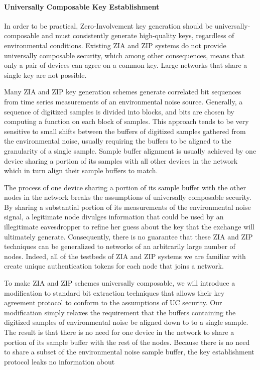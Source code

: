 \documentclass[10pt,onecolumn]{article}
\begin{document}
\paragraph{Universally Composable Key Establishment}

In order to be practical, Zero-Involvement key generation should be universally-composable and must consistently generate high-quality keys, regardless of environmental conditions.
Existing ZIA and ZIP systems do not provide universally composable security, which among other consequences, means that only a pair of devices can agree on a common key.
Large networks that share a single key are not possible.


Many ZIA and ZIP key generation schemes generate correlated bit sequences from time series measurements of an environmental noise source.
Generally, a sequence of digitized samples is divided into blocks, and bits are chosen by computing a function on each block of samples\cite{voltkey,Lin-H2B,Lee-WiSec20}.
This approach tends to be very sensitive to small shifts between the buffers of digitized samples gathered from the environmental noise, usually requiring the buffers to be aligned to the granularity of a single sample.
Sample buffer alignment is usually achieved by one device sharing a portion of its samples with all other devices in the network which in turn align their sample buffers to match.


The process of one device sharing a portion of its sample buffer with the other nodes in the network breaks the assumptions of universally composable security.
By sharing a substantial portion of its measurements of the environmental noise signal, a legitimate node divulges information that could be used by an illegitimate eavesdropper to refine her guess about the key that the exchange will ultimately generate.
Consequently, there is no guarantee that these ZIA and ZIP techniques can be generalized to networks of an arbitrarily large number of nodes.
Indeed, all of the testbeds of ZIA and ZIP systems we are familiar with create unique authentication tokens for each node that joins a network.


To make ZIA and ZIP schemes universally composable, we will introduce a modification to standard bit extraction techniques that allows their key agreement protocol to conform to the assumptions of UC security.
Our modification simply relaxes the requirement that the buffers containing the digitized samples of environmental noise be aligned down to to a single sample.
The result is that there is no need for one device in the network to share a portion of its sample buffer with the rest of the nodes.
Because there is no need to share a subset of the environmental noise sample buffer, the key establishment protocol leaks no information about 
\end{document}
